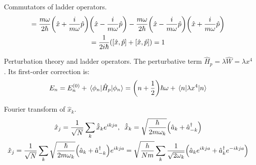 \documentclass{report}
\begin{document}
\begin{subquests}
	\item Commutators of ladder operators.
	\begin{gather*}
		[\hat{a}, \hat{a}^{\dagger}] = \frac{m\omega}{2\hbar}\pqty{\hat{x} + \frac{i}{m\omega}\hat{p}}\pqty{\hat{x} - \frac{i}{m\omega}\hat{p}} - \frac{m\omega}{2\hbar}\pqty{\hat{x} - \frac{i}{m\omega}\hat{p}}\pqty{\hat{x} + \frac{i}{m\omega}\hat{p}} \\ 
		= \frac{1}{2i\hbar}\pqty{[\hat{x},\hat{p}] + [\hat{x},\hat{p}]} = 1
	\end{gather*}

	\item Perturbation theory and ladder operators. The perturbative term $\hat H_p = \lambda \hat W = \lambda x^4$. Its first-order correction is:
	\begin{gather*}
		E_n = E_n^{(0)} + \mel{\phi_n}{\hat H_p}{\phi_n} = \pqty{n + \frac{1}{2}}\hbar \omega + \mel{n}{\lambda x^4}{n} 
	\end{gather*}

	\item Fourier transform of $\hat{x}_k$. 
	\begin{gather*}
		\hat{x}_j = \frac{1}{\sqrt{N}}\sum_{k}\hat{\tilde{x}}_k e^{ikja}, \;\; \hat{\tilde x}_k = \sqrt{\frac{\hbar}{2m\omega_k}}\pqty{\hat{a}_k + \hat{a}_{-k}^{\dagger}} \\
		\hat{x}_j = \frac{1}{\sqrt{N}}\sum_{k} \sqrt{\frac{\hbar}{2m\omega_k}}\pqty{\hat{a}_k + \hat{a}_{-k}^{\dagger}}e^{ikja} = \sqrt{\frac{h}{Nm}}\sum_{k}\frac{1}{\sqrt{2\omega_k}}\pqty{\hat{a}_k e^{ikja}+ \hat{a}_{k}^{\dagger}e^{-ikja}}
	\end{gather*}


\end{subquests}
\end{document}
